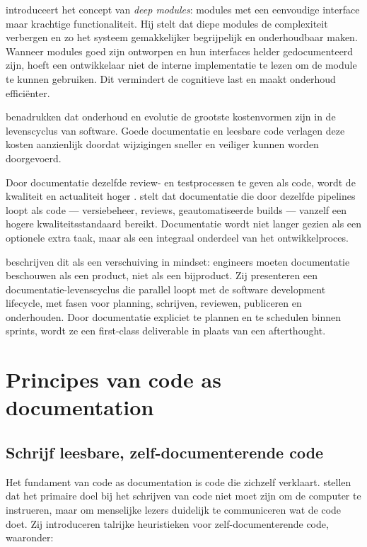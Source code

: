 \textcite{ousterhout2018philosophy} introduceert het concept van \textit{deep modules}: modules met een eenvoudige interface maar krachtige functionaliteit. Hij stelt dat diepe modules de complexiteit verbergen en zo het systeem gemakkelijker begrijpelijk en onderhoudbaar maken. Wanneer modules goed zijn ontworpen en hun interfaces helder gedocumenteerd zijn, hoeft een ontwikkelaar niet de interne implementatie te lezen om de module te kunnen gebruiken. Dit vermindert de cognitieve last en maakt onderhoud efficiënter.

\textcite{tripathy2014softwareevolution} benadrukken dat onderhoud en evolutie de grootste kostenvormen zijn in de levenscyclus van software. Goede documentatie en leesbare code verlagen deze kosten aanzienlijk doordat wijzigingen sneller en veiliger kunnen worden doorgevoerd.

Door documentatie dezelfde review- en testprocessen te geven als code, wordt de kwaliteit en actualiteit hoger \autocite{gentle2017docslikecode}. \textcite{etter2016moderntechwriting} stelt dat documentatie die door dezelfde pipelines loopt als code --- versiebeheer, reviews, geautomatiseerde builds --- vanzelf een hogere kwaliteitsstandaard bereikt. Documentatie wordt niet langer gezien als een optionele extra taak, maar als een integraal onderdeel van het ontwikkelproces.

\textcite{bhatti2021docsdevelopers} beschrijven dit als een verschuiving in mindset: engineers moeten documentatie beschouwen als een product, niet als een bijproduct. Zij presenteren een documentatie-levenscyclus die parallel loopt met de software development lifecycle, met fasen voor planning, schrijven, reviewen, publiceren en onderhouden. Door documentatie expliciet te plannen en te schedulen binnen sprints, wordt ze een first-class deliverable in plaats van een afterthought.

\section{Principes van code as documentation}
\label{sec:cad-principes}

\subsection{Schrijf leesbare, zelf-documenterende code}
Het fundament van code as documentation is code die zichzelf verklaart. \textcite{boswell2011readablecode} stellen dat het primaire doel bij het schrijven van code niet moet zijn om de computer te instrueren, maar om menselijke lezers duidelijk te communiceren wat de code doet. Zij introduceren talrijke heuristieken voor zelf-documenterende code, waaronder:

